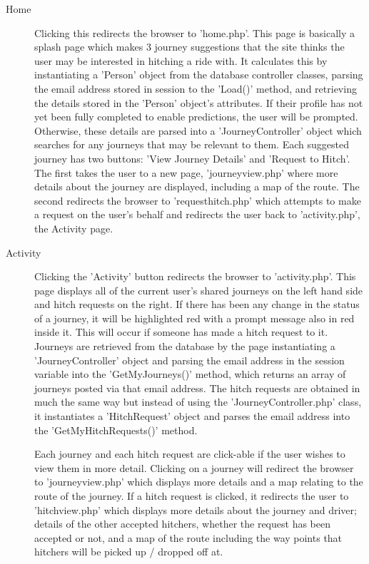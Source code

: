 		\begin{description}
		\item[Home] Clicking this redirects the browser to 'home.php'. This page is basically a splash page which makes 3 journey suggestions that the site thinks the user may be interested in hitching a ride with. It calculates this by instantiating a 'Person' object from the database controller classes, parsing the email address stored in session to the 'Load()' method, and retrieving the details stored in the 'Person' object's attributes. If their profile has not yet been fully completed to enable predictions, the user will be prompted. Otherwise, these details are parsed into a 'Journey\textunderscore Controller' object which searches for any journeys that may be relevant to them. Each suggested journey has two buttons: 'View Journey Details' and 'Request to Hitch'. The first takes the user to a new page, 'journey\textunderscore view.php' where more details about the journey are displayed, including a map of the route. The second redirects the browser to 'request\textunderscore hitch.php' which attempts to make a request on the user's behalf and redirects the user back to 'activity.php', the Activity page.
		\item[Activity] Clicking the 'Activity' button redirects the browser to 'activity.php'. This page displays all of the current user's shared journeys on the left hand side and hitch requests on the right. If there has been any change in the status of a journey, it will be highlighted red with a prompt message also in red inside it. This will occur if someone has made a hitch request to it. Journeys are retrieved from the database by the page instantiating a 'Journey\textunderscore Controller' object and parsing the email address in the session variable into the 'GetMyJourneys()' method, which returns an array of journeys posted via that email address. The hitch requests are obtained in much the same way but instead of using the 'Journey\textunderscore Controller.php' class, it instantiates a 'Hitch\textunderscore Request' object and parses the email address into the 'GetMyHitchRequests()' method. 
		
		Each journey and each hitch request are click-able if the user wishes to view them in more detail. Clicking on a journey will redirect the browser to 'journey\textunderscore view.php' which displays more details and a map relating to the route of the journey. If a hitch request is clicked, it redirects the user to 'hitch\textunderscore view.php' which displays more details about the journey and driver; details of the other accepted hitchers, whether the request has been accepted or not, and a map of the route including the way points that hitchers will be picked up / dropped off at.


\end{description}
